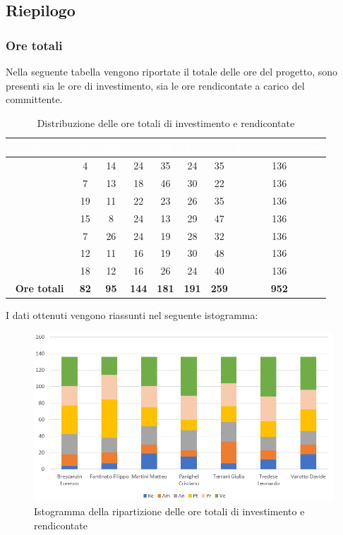\subsection{Riepilogo}
\subsubsection{Ore totali}
Nella seguente tabella vengono riportate il totale delle ore del progetto, sono presenti sia le ore di investimento, sia le ore rendicontate a carico del committente.
\begin{table}[H]
	\begin{center}
		\begin{tabular}{ |c c c c c c c c| }
		\rowcolor{darkblue} 
		\textcolor{white}{\textbf{Nominativo}} & \textcolor{white}{\textbf{Re}} & \textcolor{white}{\textbf{Am}} & \textcolor{white}{\textbf{An}} & \textcolor{white}{\textbf{Pt}} & \textcolor{white}{\textbf{Pr}} & \textcolor{white}{\textbf{Ve}} & \textcolor{white}{\textbf{Ore Complessive}} \\ \hline
		\BL 	& 4  	& 14  	& 24 	& 35 	& 24 	& 35 	& 136 \\ \hline
		\FF 	& 7 	& 13 	& 18 	& 46 	& 30 	& 22 	& 136 \\ \hline
		\MM 	& 19  	& 11  	& 22 	& 23 	& 26 	& 35  	& 136 \\ \hline
		\PC 	& 15 	& 8  	& 24 	& 13 	& 29	& 47 	& 136 \\ \hline
		\TG 	& 7  	& 26 	& 24 	& 19 	& 28 	& 32 	& 136 \\ \hline
		\TL 	& 12  	& 11 	& 16 	& 19 	& 30 	& 48 	& 136 \\ \hline
		\VD 	& 18  	& 12  	& 16 	& 26 	& 24 	& 40 	& 136 \\ \hline
		\textbf{Ore totali} & \textbf{82} & \textbf{95} & \textbf{144} & \textbf{181} & \textbf{191} & \textbf{259} & \textbf{952} \\ \hline
		\end{tabular}
	\caption{Distribuzione delle ore totali di investimento e rendicontate}
	\end{center}
\end{table}
I dati ottenuti vengono riassunti nel seguente istogramma:
\begin{figure}[H]
    \centering
    \includegraphics[scale = 0.70]{Immagini/TotaleIsto.png}
    \caption{Istogramma della ripartizione delle ore totali di investimento e rendicontate}
    \label{fig:Istogramma ripartizione ore totali di investimento e rendicontate }
\end{figure}
